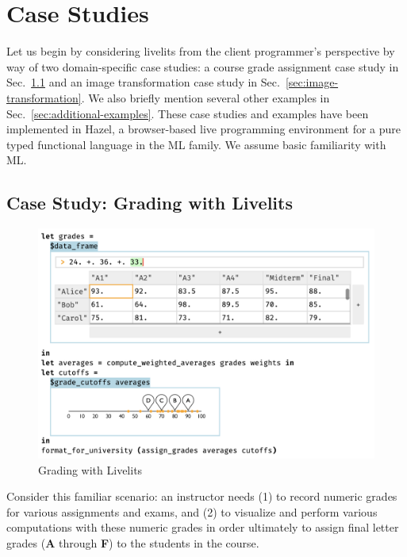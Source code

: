 \section{Case Studies}\label{sec:case-studies}
Let us begin by considering livelits from the client programmer's perspective by way of
two domain-specific case studies:
a course grade assignment case study in Sec.~\ref{sec:live-grading}
and an image transformation case study in Sec.~\ref{sec:image-transformation}.
We also briefly mention several other examples in Sec.~\ref{sec:additional-examples}.
These case studies and examples have been implemented
in Hazel, a browser-based live programming environment for a pure typed functional language in the
ML family. We assume basic familiarity with ML.

\subsection{Case Study: Grading with Livelits}\label{sec:live-grading}
\begin{figure}
    \includegraphics[width=30pc]{grade-cutoff-livelit.png}
\caption{Grading with Livelits}
\label{fig:grading}
\end{figure}

Consider this familiar scenario: an instructor needs
(1) to record numeric grades for various assignments and exams, and
(2) to visualize and perform various computations with these numeric grades
in order ultimately to assign final letter grades (\textbf{A} through \textbf{F}) to the students in the course.

